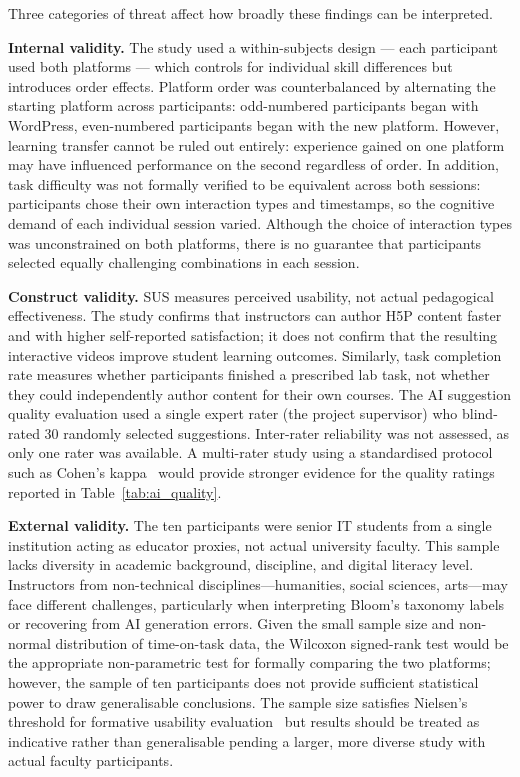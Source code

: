 Three categories of threat affect how broadly these findings can be interpreted.

\textbf{Internal validity.} The study used a within-subjects design --- each participant used both platforms --- which controls for individual skill differences but introduces order effects. Platform order was counterbalanced by alternating the starting platform across participants: odd-numbered participants began with WordPress, even-numbered participants began with the new platform. However, learning transfer cannot be ruled out entirely: experience gained on one platform may have influenced performance on the second regardless of order. In addition, task difficulty was not formally verified to be equivalent across both sessions: participants chose their own interaction types and timestamps, so the cognitive demand of each individual session varied. Although the choice of interaction types was unconstrained on both platforms, there is no guarantee that participants selected equally challenging combinations in each session.

\textbf{Construct validity.} SUS measures perceived usability, not actual pedagogical effectiveness. The study confirms that instructors can author H5P content faster and with higher self-reported satisfaction; it does not confirm that the resulting interactive videos improve student learning outcomes. Similarly, task completion rate measures whether participants finished a prescribed lab task, not whether they could independently author content for their own courses. The AI suggestion quality evaluation used a single expert rater (the project supervisor) who blind-rated 30 randomly selected suggestions. Inter-rater reliability was not assessed, as only one rater was available. A multi-rater study using a standardised protocol such as Cohen's kappa~\cite{cohen1960} would provide stronger evidence for the quality ratings reported in Table~\ref{tab:ai_quality}.

\textbf{External validity.} The ten participants were senior IT students from a single institution acting as educator proxies, not actual university faculty. This sample lacks diversity in academic background, discipline, and digital literacy level. Instructors from non-technical disciplines---humanities, social sciences, arts---may face different challenges, particularly when interpreting Bloom's taxonomy labels or recovering from AI generation errors. Given the small sample size and non-normal distribution of time-on-task data, the Wilcoxon signed-rank test would be the appropriate non-parametric test for formally comparing the two platforms; however, the sample of ten participants does not provide sufficient statistical power to draw generalisable conclusions. The sample size satisfies Nielsen's threshold for formative usability evaluation~\cite{nielsen1994} but results should be treated as indicative rather than generalisable pending a larger, more diverse study with actual faculty participants.

